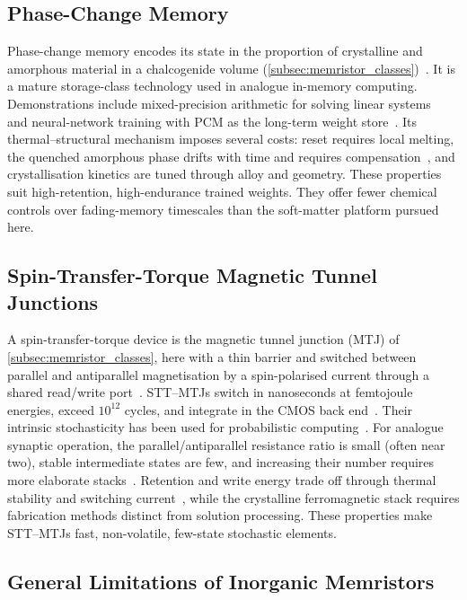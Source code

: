 \documentclass[12pt, twoside]{report}
\begin{document}
\subsection{Phase-Change Memory}\label{subsec:pcm}

Phase-change memory encodes its state in the proportion of crystalline and amorphous material in a chalcogenide volume (\cref{subsec:memristor_classes})~\cite{Koelmans2015}. It is a mature storage-class technology used in analogue in-memory computing. Demonstrations include mixed-precision arithmetic for solving linear systems~\cite{LGallo2018} and neural-network training with PCM as the long-term weight store~\cite{Ambrogio2018,Wong2010}. Its thermal--structural mechanism imposes several costs: reset requires local melting, the quenched amorphous phase drifts with time and requires compensation~\cite{Sebastian2014}, and crystallisation kinetics are tuned through alloy and geometry. These properties suit high-retention, high-endurance trained weights. They offer fewer chemical controls over fading-memory timescales than the soft-matter platform pursued here.


\subsection{Spin-Transfer-Torque Magnetic Tunnel Junctions}\label{subsec:stt_mtj}

A spin-transfer-torque device is the magnetic tunnel junction (MTJ) of \cref{subsec:memristor_classes}, here with a thin  barrier and switched between parallel and antiparallel magnetisation by a spin-polarised current through a shared read/write port~\cite{Chappert2007}. STT--MTJs switch in nanoseconds at femtojoule energies, exceed \(10^{12}\) cycles, and integrate in the CMOS back end~\cite{Bhatti2017}. Their intrinsic stochasticity has been used for probabilistic computing~\cite{Torrejon2017, Mizrahi2018}. For analogue synaptic operation, the parallel/antiparallel resistance ratio is small (often near two), stable intermediate states are few, and increasing their number requires more elaborate stacks~\cite{Ikeda2010, Bhatti2017}. Retention and write energy trade off through thermal stability and switching current~\cite{Bhatti2017}, while the crystalline ferromagnetic stack requires fabrication methods distinct from solution processing. These properties make STT--MTJs fast, non-volatile, few-state stochastic elements.

\subsection{General Limitations of Inorganic Memristors}\label{subsec:inorganic_limits}
\end{document}
